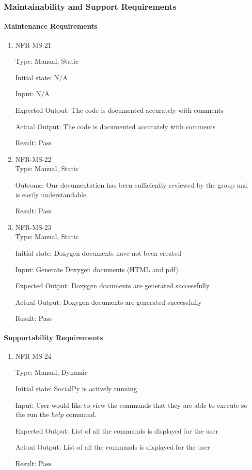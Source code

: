 \documentclass[12pt, titlepage]{article}
\begin{document}
\subsubsection{Maintainability and Support Requirements}
\paragraph{Maintenance Requirements}
\begin{enumerate}
    \item{NFR-MS-21\\}
    
    Type: Manual, Static
    
    Initial state: N/A
    
    Input: N/A
    
    Expected Output: The code is documented accurately with comments

    Actual Output: The code is documented accurately with comments
    					
    Result: Pass
    
    \item{NFR-MS-22\\}
    Type: Manual, Static
    
    Outcome: Our documentation has been sufficiently reviewed by the group and is easily understandable. 
    					
    Result: Pass
    
    \item{NFR-MS-23\\}
    Type: Manual, Static
    
    Initial state: Doxygen documents have not been created
    
    Input: Generate Doxygen documents (HTML and pdf)
    
    Expected Output: Doxygen documents are generated successfully
    
    Actual Output: Doxygen documents are generated successfully
    					
    Result: Pass
    
 \end{enumerate} 
 
 \paragraph{Supportability Requirements}
\begin{enumerate}
    \item{NFR-MS-24\\}
    
    Type: Manual, Dynamic
    
    Initial state: SocialPy is actively running
    
    Input: User would like to view the commands that they are able to execute so the run the $help$ command.
    
    Expected Output: List of all the commands is displayed for the user
    
    Actual Output:  List of all the commands is displayed for the user
    					
    Result: Pass

 \end{enumerate} 
 
\end{document}
